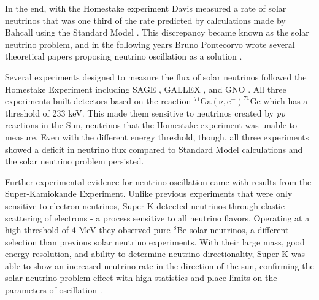 In the end, with the Homestake experiment Davis measured a rate of solar neutrinos that was one third of the rate predicted by calculations made by Bahcall using the Standard Model \cite{Davis}. 
This discrepancy became known as the solar neutrino problem, and in the following years Bruno Pontecorvo wrote several theoretical papers proposing neutrino oscillation as a solution \cite{Pont1968,Pont1977}.

Several experiments designed to measure the flux of solar neutrinos followed the Homestake Experiment including SAGE \cite{Abdurashitov:1994bc}, GALLEX \cite{Hampel:1998xg}, and GNO \cite{Altmann:2000ft,Bellotti:2001ta}.
All three experiments built detectors based on the reaction $\mathrm{^{71}Ga(\nu,e^{-})^{71}Ge}$ which has a threshold of 233 keV.
This made them sensitive to neutrinos created by \textit{pp} reactions in the Sun, neutrinos that the Homestake experiment was unable to measure.
Even with the different energy threshold, though, all three experiments showed a deficit in neutrino flux compared to Standard Model calculations and the solar neutrino problem persisted.

Further experimental evidence for neutrino oscillation came with results from the Super-Kamiokande Experiment. Unlike previous experiments that were only sensitive to electron neutrinos, Super-K detected neutrinos through elastic scattering of electrons - a process sensitive to all neutrino flavors.
Operating at a high threshold of 4 MeV they observed pure $^{8}$Be solar neutrinos, a different selection than previous solar neutrino experiments.
With their large mass, good energy resolution, and ability to determine neutrino directionality, Super-K was able to show an increased neutrino rate in the direction of the sun, confirming the solar neutrino problem effect with high statistics and place limits on the parameters of oscillation \cite{SuperKOsc}.


